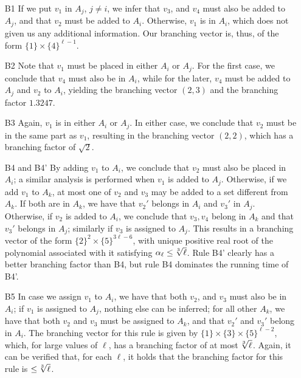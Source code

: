 \begin{itemize}
	\item[B1] If we put $v_1$ in $A_j$, $j \neq i$, we infer that $v_3$, and $v_4$ must also be added to $A_j$, and that $v_2$ must be added to $A_i$.
	Otherwise, $v_1$ is in $A_i$, which does not given us any additional information.
	Our branching vector is, thus, of the form $\{1\} \times \{4\}^{\ell-1}$.
	
	\item[B2] Note that $v_1$ must be placed in either $A_i$ or $A_j$.
	For the first case, we conclude that $v_4$ must also be in $A_i$, while for the later, $v_4$ must be added to $A_j$ and $v_2$ to $A_i$, yielding the branching vector $(2, 3)$ and the branching factor $1.3247$.
	
	\item[B3] Again, $v_1$ is in either $A_i$ or $A_j$.
	In either case, we conclude that $v_2$ must be in the same part as $v_1$, resulting in the branching vector $(2,2)$, which has a branching factor of $\sqrt{2}$.
	
	\item[B4 and B4'] By adding $v_1$ to $A_i$, we conclude that $v_2$ must also be placed in $A_i$; a similar analysis is performed when $v_1$ is added to $A_j$.
	Otherwise, if we add $v_1$ to $A_k$, at most one of $v_2$ and $v_3$ may be added to a set different from $A_k$.
	If both are in $A_k$, we have that $v_2'$ belongs in $A_i$ and $v_3'$ in $A_j$.
	Otherwise, if $v_2$ is added to $A_i$, we conclude that $v_3,v_4$ belong in $A_k$ and that $v_3'$ belongs in $A_j$; similarly if $v_3$ is assigned to $A_j$.
	This results in a branching vector of the form $\{2\}^2 \times \{5\}^{3\ell-6}$, with unique positive real root of the polynomial associated with it satisfying $\alpha_\ell \leq \sqrt[\leftroot{2} 3]{\ell}$.
	Rule B4' clearly has a better branching factor than B4, but rule B4 dominates the running time of B4'.
	
	\item[B5] In case we assign $v_1$ to $A_i$, we have that both $v_2$, and $v_3$ must also be in $A_i$;
	if $v_1$ is assigned to $A_j$, nothing else can be inferred;
	for all other $A_k$, we have that both $v_2$ and $v_3$ must be assigned to $A_k$, and that $v_2'$ and $v_3'$ belong in $A_i$.
	The branching vector for this rule is given by $\{1\} \times \{3\} \times \{5\}^{\ell-2}$, which, for large values of $\ell$, has a branching factor of at most $\sqrt[\leftroot{2} 3]{\ell}$.
	Again, it can be verified that, for each $\ell$, it holds that the branching factor for this rule is $\leq \sqrt[\leftroot{2} 3]{\ell}$.
	

\end{itemize}
